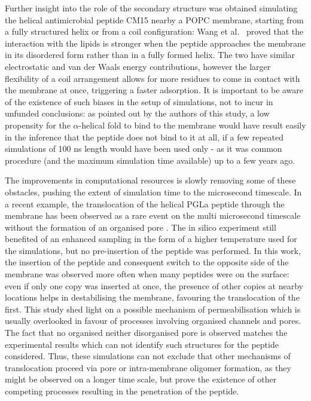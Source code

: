 Further insight into the role of the secondary structure was obtained simulating the helical antimicrobial peptide CM15 nearby a POPC membrane, starting from a fully structured helix or from a coil configuration: Wang et al.\ \cite{Wang2012} proved that the interaction with the lipids is stronger when the peptide approaches the membrane in its disordered form rather than in a fully formed helix. The two have similar electrostatic and van der Waals energy contributions, however the larger flexibility of a coil arrangement allows for more residues to come in contact with the membrane at once, triggering a faster adsorption. It is important to be aware of the existence of such biases in the setup of simulations, not to incur in unfunded conclusions: as pointed out by the authors of this study, a low propensity for the $\alpha$-helical fold to bind to the membrane would have result easily in the inference that the peptide does not bind to it at all, if a few repeated simulations of 100 ns length would have been used only - as it was common procedure (and the maximum simulation time available) up to a few years ago.

The improvements in computational resources is slowly removing some of these obstacles, pushing the extent of simulation time to the microsecond timescale.
%
In a recent example, the translocation of the helical PGLa peptide through the membrane has been observed as a rare event on the multi microsecond timescale without the formation of an organised pore \cite{Ulmschneider2017}. The in silico experiment still benefited of an enhanced sampling in the form of a higher temperature used for the simulations, but no pre-insertion of the peptide was performed. In this work, the insertion of the peptide and consequent switch to the opposite side of the membrane was observed more often when many peptides were on the surface: even if only one copy was inserted at once, the presence of other copies at nearby locations helps in destabilising the membrane, favouring the translocation of the first. This study shed light on a possible mechanism of permeabilisation which is usually overlooked in favour of processes involving organised channels and pores. The fact that no organised neither disorganised pore is observed matches the experimental results which can not identify such structures for the peptide considered. Thus, these simulations can not exclude that other mechanisms of translocation proceed via pore or intra-membrane oligomer formation, as they might be observed on a longer time scale, but prove the existence of other competing processes resulting in the penetration of the peptide.

